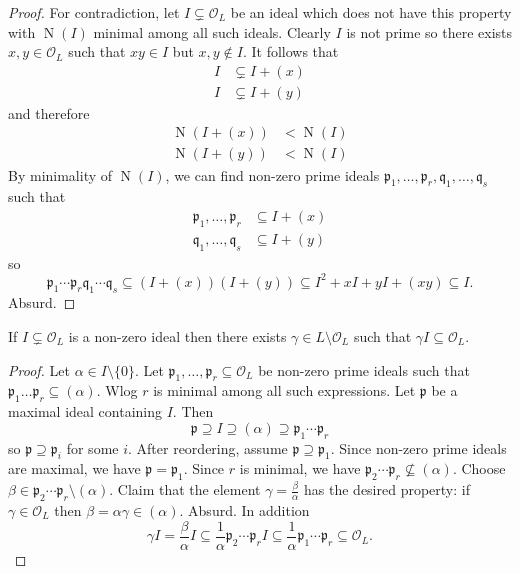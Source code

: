 \documentclass[a4paper]{article}
\renewcommand*{\O}{\mathcal{O}}
\DeclareMathOperator{\n}{N}
\begin{document}
\begin{proof}
  For contradiction, let \(I \subsetneq \O_L\) be an ideal which does not have this property with \(\n(I)\) minimal among all such ideals. Clearly \(I\) is not prime so there exists \(x, y \in \O_L\) such that \(xy \in I\) but \(x, y \notin I\). It follows that
  \begin{align*}
    I &\subsetneq I + (x) \\
    I &\subsetneq I + (y)
  \end{align*}
  and therefore
  \begin{align*}
    \n(I + (x)) &< \n(I) \\
    \n(I + (y)) &< \n(I)
  \end{align*}
  By minimality of \(\n(I)\), we can find non-zero prime ideals \(\mathfrak{p}_1, \dots, \mathfrak{p}_r, \mathfrak{q}_1, \dots, \mathfrak{q}_s\) such that
  \begin{align*}
    \mathfrak{p}_1, \dots, \mathfrak{p}_r &\subseteq I + (x) \\
    \mathfrak{q}_1, \dots, \mathfrak{q}_s &\subseteq I + (y)
  \end{align*}
  so
  \[
    \mathfrak{p}_1 \cdots \mathfrak{p}_r\mathfrak{q}_1 \cdots \mathfrak{q}_s \subseteq (I + (x))(I + (y)) \subseteq I^2 + xI + yI + (xy) \subseteq I.
  \]
  Absurd.
\end{proof}

\begin{lemma}
  If \(I \subsetneq \O_L\) is a non-zero ideal then there exists \(\gamma \in L \setminus \O_L\) such that \(\gamma I \subseteq \O_L\).
\end{lemma}

\begin{proof}
  Let \(\alpha \in I \setminus \{0\}\). Let \(\mathfrak{p}_1, \dots, \mathfrak{p}_r \subseteq \O_L\) be non-zero prime ideals such that \(\mathfrak{p}_1 \dots \mathfrak{p}_r \subseteq (\alpha)\). Wlog \(r\) is minimal among all such expressions. Let \(\mathfrak{p}\) be a maximal ideal containing \(I\). Then
  \[
    \mathfrak{p} \supseteq I \supseteq (\alpha) \supseteq \mathfrak{p}_1 \cdots \mathfrak{p}_r
  \]
  so \(\mathfrak{p} \supseteq \mathfrak{p}_i\) for some \(i\). After reordering, assume \(\mathfrak{p} \supseteq \mathfrak{p}_1\). Since non-zero prime ideals are maximal, we have \(\mathfrak{p} = \mathfrak{p}_1\). Since \(r\) is minimal, we have \(\mathfrak{p}_2 \cdots \mathfrak{p}_r \nsubseteq (\alpha)\). Choose \(\beta \in \mathfrak{p}_2 \cdots \mathfrak{p}_r \setminus (\alpha)\). Claim that the element \(\gamma = \frac{\beta}{\alpha}\) has the desired property: if \(\gamma \in \O_L\) then \(\beta = \alpha\gamma \in (\alpha)\). Absurd. In addition
  \[
    \gamma I = \frac{\beta}{\alpha}I \subseteq \frac{1}{\alpha} \mathfrak{p}_2 \cdots \mathfrak{p}_r I \subseteq \frac{1}{\alpha} \mathfrak{p}_1\cdots \mathfrak{p}_r \subseteq \O_L.
  \]
\end{proof}
\end{document}
